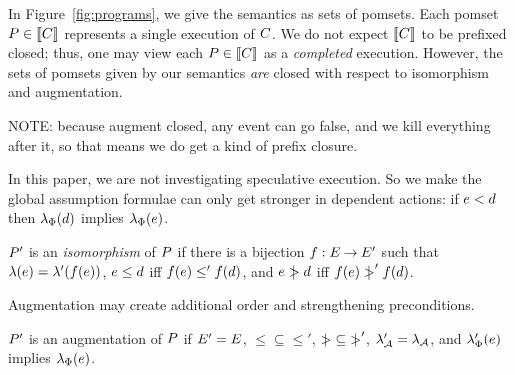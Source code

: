 In Figure~\ref{fig:programs}, we give the semantics as sets of pomsets.  
Each pomset
$P\in\llbracket C\rrbracket$ represents a single execution of $C$.  We do not
expect $\llbracket C\rrbracket$ to be prefixed closed; thus, one may view each
$P\in\llbracket C\rrbracket$ as a \emph{completed} execution.  However, the sets of
pomsets given by our semantics \emph{are} closed with respect to
isomorphism and augmentation.

NOTE: because augment closed, any event can go false, and we kill everything
after it, so that means we do get a kind of prefix closure.

In this paper, we are not investigating speculative execution.  So we make
the global assumption formulae can only get stronger in dependent actions:
if $e<d$ then
$\lambda_{\Phi}(d)$ implies $\lambda_{\Phi}(e)$.
 
\begin{definition}
  $P'$ is an \emph{isomorphism} of $P$ if there is a bijection
  $f:E\mathbin\rightarrow E'$ such that
  $\lambda(e)=\lambda'(f(e))$,
  $e\le d$ iff $f(e)\le'f(d)$, and
  $e\mathrel{\mkern4mu\mid\!\!\!>}d$ iff $f(e)\mathrel{\mkern4mu\mid\!\!\!>}'f(d)$.
\end{definition}
Augmentation may create additional order and strengthening
preconditions.
\begin{definition}
  $P'$ is an augmentation of $P$ if $E'=E$,
  ${\le}\subseteq{\le'}$, %
  ${\mathrel{\mkern4mu\mid\!\!\!>}}\subseteq{\mathrel{\mkern4mu\mid\!\!\!>}'}$, %
  $\lambda_{\mathcal{A}}'=\lambda_{\mathcal{A}}$, and %
  $\lambda_{\Phi}'(e)$ implies $\lambda_{\Phi}(e)$.
\end{definition}

